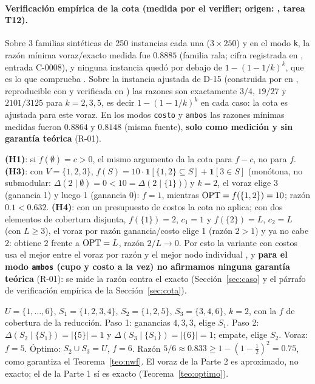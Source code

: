 \paragraph{Verificación empírica de la cota (medida por el verifier; origen: , tarea T12).} Sobre 3 familias sintéticas de 250 instancias cada una ($3\times250$) y en el modo \texttt{k}, la razón mínima voraz/exacto medida fue $0.8885$ (familia rala; cifra registrada en , entrada C-0008), y ninguna instancia quedó por debajo de $1-(1-1/k)^k$, que es lo que comprueba . Sobre la instancia ajustada de D-15 (construida por  en , reproducible con  y verificada en ) las razones son exactamente $3/4$, $19/27$ y $2101/3125$ para $k=2,3,5$, es decir $1-(1-1/k)^k$ en cada caso: la cota es ajustada para este voraz. En los modos \texttt{costo} y \texttt{ambos} las razones mínimas medidas fueron $0.8864$ y $0.8148$ (misma fuente), \textbf{solo como medición y sin garantía teórica} (R-01).

\begin{observacion}
\textbf{(H1)}: si $f(\emptyset)=c>0$, el mismo argumento da la cota para $f-c$, no para $f$. \textbf{(H3)}: con $V=\{1,2,3\}$, $f(S)=10\cdot\mathbf{1}[\{1,2\}\subseteq S]+\mathbf{1}[3\in S]$ (monótona, no submodular: $\Delta(2\mid\emptyset)=0<10=\Delta(2\mid\{1\})$) y $k=2$, el voraz elige 3 (ganancia 1) y luego 1 (ganancia 0): $f=1$, mientras $\mathrm{OPT}=f(\{1,2\})=10$; razón $0.1<0.632$. \textbf{(H4)}: con un presupuesto de costos la cota no aplica; con dos elementos de cobertura disjunta, $f(\{1\})=2$, $c_1=1$ y $f(\{2\})=L$, $c_2=L$ (con $L\ge3$), el voraz por razón ganancia/costo elige 1 (razón $2>1$) y ya no cabe 2: obtiene $2$ frente a $\mathrm{OPT}=L$, razón $2/L\to0$. Por esto la variante con costos usa el mejor entre el voraz por razón y el mejor nodo individual \cite{kmn1999}, y \textbf{para el modo \texttt{ambos} (cupo y costo a la vez) no afirmamos ninguna garantía teórica} (R-01): se mide la razón contra el exacto (Sección~\ref{sec:caso} y el párrafo de verificación empírica de la Sección~\ref{sec:cota}).
\end{observacion}

\begin{contraejemplo}
$U=\{1,\dots,6\}$, $S_1=\{1,2,3,4\}$, $S_2=\{1,2,5\}$, $S_3=\{3,4,6\}$, $k=2$, con la $f$ de cobertura de la reducción. Paso 1: ganancias $4,3,3$, elige $S_1$. Paso 2: $\Delta(S_2\mid\{S_1\})=|\{5\}|=1$ y $\Delta(S_3\mid\{S_1\})=|\{6\}|=1$; empate, elige $S_2$. Voraz: $f=5$. Óptimo: $S_2\cup S_3=U$, $f=6$. Razón $5/6\approx0.833\ge1-(1-\frac12)^2=0.75$, como garantiza el Teorema~\ref{teo:nwf}. El voraz de la Parte 2 es aproximado, no exacto; el de la Parte 1 sí es exacto (Teorema~\ref{teo:optimo}).
\end{contraejemplo}

